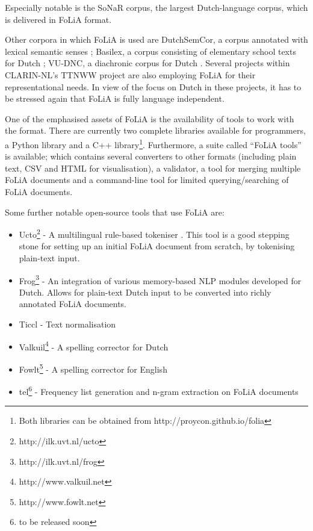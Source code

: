 \documentclass[a4paper,10pt,twoside]{article}
\begin{document}
Especially notable is the SoNaR corpus, the largest Dutch-language corpus,
which is delivered in FoLiA format. 

Other corpora in which FoLiA is used are DutchSemCor, a corpus annotated with
lexical semantic senses \cite{DUTCHSEMCOR}; Basilex, a corpus consisting of elementary school
texts for Dutch \cite{BASILEX}; VU-DNC, a diachronic corpus for Dutch
\cite{VUDNC}. Several projects within CLARIN-NL's TTNWW project are also
employing FoLiA for their representational needs. In view of the focus on Dutch
in these projects, it has to be stressed again that FoLiA is fully language independent.

One of the emphasised assets of FoLiA is the availability of tools to work with the
format. There are currently two complete libraries available for programmers, a Python
library and a C++ library\footnote{Both libraries can be obtained from
http://proycon.github.io/folia}. Furthermore, a suite called ``FoLiA tools'' is
available; which contains several converters to other formats (including plain
text, CSV and HTML for visualisation), a validator, a tool for merging
multiple FoLiA documents and a command-line tool for limited querying/searching of FoLiA documents.

Some further notable open-source tools that use FoLiA are:

\begin{itemize}
  \item Ucto\footnote{http://ilk.uvt.nl/ucto} - A multilingual rule-based
    tokeniser \cite{UCTO}. This tool is a good stepping stone for setting up an initial
    FoLiA document from scratch, by tokenising plain-text input.
 \item Frog\footnote{http://ilk.uvt.nl/frog} - An integration of various memory-based NLP modules developed for
  Dutch. Allows for plain-text Dutch input to be converted into richly
  annotated FoLiA documents.
 \item Ticcl - Text normalisation  %
 \item Valkuil\footnote{http://www.valkuil.net} - A spelling corrector for Dutch
 \item Fowlt\footnote{http://www.fowlt.net} - A spelling corrector for English
 \item tel\footnote{to be released soon} - Frequency list generation and n-gram
   extraction on FoLiA documents
\end{itemize}
\end{document}
